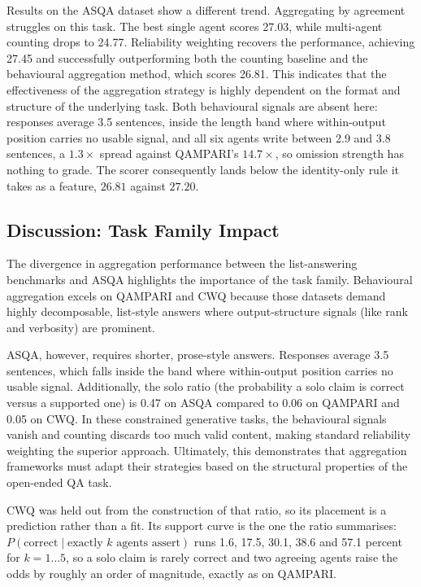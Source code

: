 \documentclass{article}
\begin{document}
Results on the ASQA dataset show a different trend. Aggregating by agreement struggles on this task. The best single agent scores 27.03, while multi-agent counting drops to 24.77. Reliability weighting recovers the performance, achieving 27.45 and successfully outperforming both the counting baseline and the behavioural aggregation method, which scores 26.81. This indicates that the effectiveness of the aggregation strategy is highly dependent on the format and structure of the underlying task. Both behavioural signals are absent here: responses average 3.5 sentences, inside the length band where within-output position carries no usable signal, and all six agents write between 2.9 and 3.8 sentences, a $1.3\times$ spread against QAMPARI's $14.7\times$, so omission strength has nothing to grade. The scorer consequently lands below the identity-only rule it takes as a feature, $26.81$ against $27.20$.

\subsection{Discussion: Task Family Impact}

The divergence in aggregation performance between the list-answering benchmarks and ASQA highlights the importance of the task family. Behavioural aggregation excels on QAMPARI and CWQ because those datasets demand highly decomposable, list-style answers where output-structure signals (like rank and verbosity) are prominent.

ASQA, however, requires shorter, prose-style answers. Responses average 3.5 sentences, which falls inside the band where within-output position carries no usable signal. Additionally, the solo ratio (the probability a solo claim is correct versus a supported one) is 0.47 on ASQA compared to 0.06 on QAMPARI and 0.05 on CWQ. In these constrained generative tasks, the behavioural signals vanish and counting discards too much valid content, making standard reliability weighting the superior approach. Ultimately, this demonstrates that aggregation frameworks must adapt their strategies based on the structural properties of the open-ended QA task.

CWQ was held out from the construction of that ratio, so its placement is a prediction rather than a fit. Its support curve is the one the ratio summarises: $P(\mathrm{correct} \mid \text{exactly } k \text{ agents assert})$ runs 1.6, 17.5, 30.1, 38.6 and 57.1 percent for $k = 1 \dots 5$, so a solo claim is rarely correct and two agreeing agents raise the odds by roughly an order of magnitude, exactly as on QAMPARI.
\end{document}
